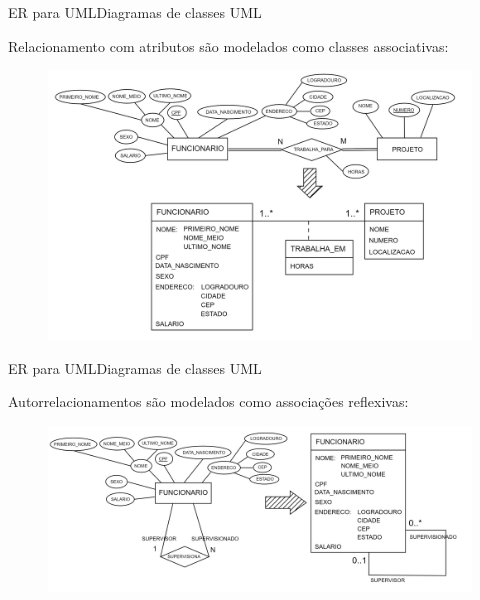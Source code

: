 \documentclass[t]{beamer}
\begin{document}
\begin{ftst}{ER para UML}{Diagramas de classes UML}

Relacionamento com atributos são modelados como classes associativas:

\vone
\begin{figure}
    \centering
    \includegraphics[scale=0.1]{Figuras/UML_4.png}

\end{figure}
\end{ftst}


\begin{ftst}{ER para UML}{Diagramas de classes UML}

Autorrelacionamentos são modelados como associações reflexivas:

\vone
\begin{figure}
    \centering
    \includegraphics[scale=0.12]{Figuras/UML_5.png}

\end{figure}
\end{ftst}

\end{document}
